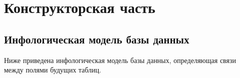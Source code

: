 \chapter{Конструкторская часть}

\section{Инфологическая модель базы данных}
Ниже приведена инфологическая модель базы данных, определяющая связи между полями будущих таблиц.
